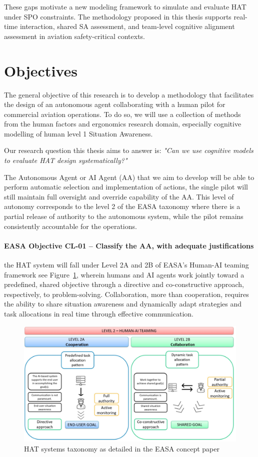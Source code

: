 \documentclass[12pt,a4paper]{article} %
\begin{document}
	These gaps motivate a new modeling framework to simulate and evaluate HAT under SPO constraints. The methodology proposed in this thesis supports real-time interaction, shared SA assessment, and team-level cognitive alignment assessment in aviation safety-critical contexts.
	
	\section{Objectives} %
	The general objective of this research is to develop a methodology that facilitates the design of an autonomous agent collaborating with a human pilot for commercial aviation operations. To do so, we will use a collection of methods from the human factors and ergonomics research domain, especially cognitive modelling of human level 1 Situation Awareness.

	Our research question this thesis aims to answer is: \textit{"Can we use cognitive models to evaluate HAT design systematically?"}

	The Autonomous Agent or AI Agent (AA) that we aim to develop will be able to perform automatic selection and implementation of actions, the single pilot will still maintain full oversight and override capability of the AA. This level of autonomy corresponds to the level 2 of the EASA taxonomy where there is a partial release of authority to the autonomous system, while the pilot remains consistently accountable for the operations.

	\paragraph{EASA Objective CL-01 -- Classify the AA, with adequate justifications} the HAT system will fall under Level 2A and 2B of EASA's Human-AI teaming framework see Figure~\ref{fig:easa-taxo}, wherein humans and AI agents work jointly toward a predefined, shared objective through a directive and co-constructive approach, respectively, to problem-solving. Collaboration, more than cooperation, requires the ability to share situation awareness and dynamically adapt strategies and task allocations in real time through effective communication. 

	\begin{figure}[H]
		\centering
		\includegraphics[width=1.0\textwidth]{./images/easa_taxo.png}
		\caption{HAT systems taxonomy as detailed in the EASA concept paper \parencite{easa_guidance_2024}}
		\label{fig:easa-taxo}
	\end{figure}
	
\end{document}
